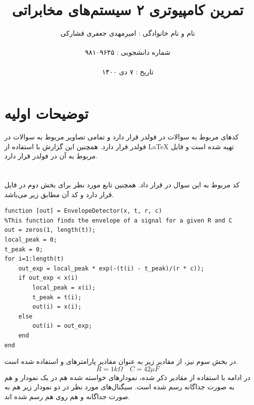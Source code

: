\documentclass[10pt]{article}
\title{تمرین کامپیوتری ۲ سیستم‌های مخابراتی}
\author{نام و نام‌ خانوادگی : امیرمهدی جعفری فشارکی
\\ \\
شماره دانشجویی : ۹۸۱۰۹۶۴۵ 	\\ \\
تاریخ : ۷ دی ۱۴۰۰ }
\date{}
\begin{document}
	\maketitle
	\pagebreak
	\newpage
	\section*{توضیحات اولیه}
	کد‌های مربوط به سوالات در فولدر 
	قرار دارد و تمامی تصاویر مربوط به سوالات در فولدر 
	قرار دارد.
	همچنین این گزارش با استفاده از
	 \LaTeX
	 تهیه شده است و فایل 
	 مربوط به آن در فولدر 
	 قرار دارد.
	\section{}
	کد‌ مربوط به این سوال در 
	قرار داد. همچنین تابع مورد نظر برای بخش دوم در فایل 
	قرار دارد و کد آن مطابق زیر می‌باشد.
	\begin{latin}
	\begin{tcolorbox}
\begin{Verbatim}[tabsize=4]
function [out] = EnvelopeDetector(x, t, r, c)
%This function finds the envelope of a signal for a given R and C
out = zeros(1, length(t));
local_peak = 0;
t_peak = 0;
for i=1:length(t)
	out_exp = local_peak * exp(-(t(i) - t_peak)/(r * c));
	if out_exp < x(i)
		local_peak = x(i);
		t_peak = t(i);
		out(i) = x(i);
	else
		out(i) = out_exp;
	end
end
\end{Verbatim}
	\end{tcolorbox}
	\end{latin}
\noindent
	 در بخش سوم نیز، از مقادیر زیر به عنوان مقادیر پارامترهای 
	و
	استفاده شده است.
	\[
	R = 1k\Omega \quad C = 42 \mu F
	\]
	\newpage
	\noindent
	در ادامه با استفاده از مقادیر ذکر شده، نمودار‌های خواسته شده هم در یک نمودار و هم به صورت جداگانه رسم شده است. سیگنال‌های مورد نظر در دو نمودار زیر هم به صورت جداگانه و هم روی هم رسم شده اند.
	
\end{document}
